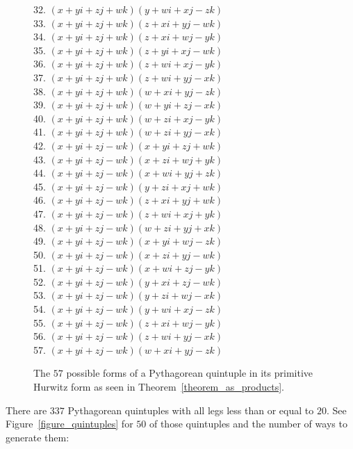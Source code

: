 \documentclass[12pt]{article}
\theoremstyle{definition}
\numberwithin{equation}{section}
\begin{document}
\begin{appendices}
{\begin{figure}
\begin{tabbing}
32. $(x+yi+zj+wk)(y+wi+xj-zk)$ \\
33. $(x+yi+zj+wk)(z+xi+yj-wk)$ \\
34. $(x+yi+zj+wk)(z+xi+wj-yk)$ \\
35. $(x+yi+zj+wk)(z+yi+xj-wk)$ \\
36. $(x+yi+zj+wk)(z+wi+xj-yk)$ \\
37. $(x+yi+zj+wk)(z+wi+yj-xk)$ \\
38. $(x+yi+zj+wk)(w+xi+yj-zk)$ \\
39. $(x+yi+zj+wk)(w+yi+zj-xk)$ \\
40. $(x+yi+zj+wk)(w+zi+xj-yk)$ \\
41. $(x+yi+zj+wk)(w+zi+yj-xk)$ \\
42. $(x+yi+zj-wk)(x+yi+zj+wk)$ \\
43. $(x+yi+zj-wk)(x+zi+wj+yk)$ \\
44. $(x+yi+zj-wk)(x+wi+yj+zk)$ \\
45. $(x+yi+zj-wk)(y+zi+xj+wk)$ \\
46. $(x+yi+zj-wk)(z+xi+yj+wk)$ \\
47. $(x+yi+zj-wk)(z+wi+xj+yk)$ \\
48. $(x+yi+zj-wk)(w+zi+yj+xk)$ \\
49. $(x+yi+zj-wk)(x+yi+wj-zk)$ \\
50. $(x+yi+zj-wk)(x+zi+yj-wk)$ \\
51. $(x+yi+zj-wk)(x+wi+zj-yk)$ \\
52. $(x+yi+zj-wk)(y+xi+zj-wk)$ \\
53. $(x+yi+zj-wk)(y+zi+wj-xk)$ \\
54. $(x+yi+zj-wk)(y+wi+xj-zk)$ \\
55. $(x+yi+zj-wk)(z+xi+wj-yk)$ \\
56. $(x+yi+zj-wk)(z+wi+yj-xk)$ \\
57. $(x+yi+zj-wk)(w+xi+yj-zk)$ 
\end{tabbing}
\caption{The $57$ possible forms of a Pythagorean quintuple in its primitive Hurwitz form as seen in Theorem~\ref{theorem_as_products}.} 
\label{figure_57}
\end{figure}
}



There are $337$ Pythagorean quintuples 
with all legs less than or equal to $20$.
See Figure~\ref{figure_quintuples}
for $50$ of those quintuples and
the number of ways to generate them:



\end{appendices}
\end{document}
